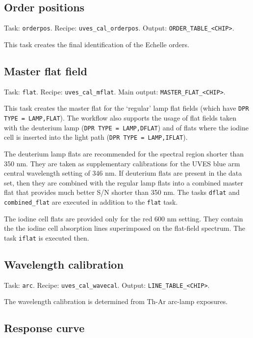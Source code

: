 \subsection{Order positions}

Task: {\tt orderpos}. Recipe: {\tt uves\_cal\_orderpos}. Output: {\tt ORDER\_TABLE\_<CHIP>}.

This task creates the final identification of the Echelle orders.

\subsection{Master flat field}

Task: {\tt flat}. Recipe: {\tt uves\_cal\_mflat}. Main output: {\tt  MASTER\_FLAT\_<CHIP>}.

This task creates the master flat for the `regular' lamp flat fields (which have {\tt DPR TYPE = 
LAMP,FLAT}). The workflow also supports the usage of flat fields taken with the deuterium lamp
({\tt DPR TYPE = LAMP,DFLAT}) and of flats where the iodine cell is inserted into the light path
({\tt DPR TYPE = LAMP,IFLAT}). 

The deuterium lamp flats are recommended for the spectral region shorter than 350 nm. 
They are taken as supplementary calibrations for
the UVES blue arm central wavelength setting of 346 nm. 
If deuterium flats are present in the data set,
then they are combined with the regular lamp flats into a combined master flat that provides much better
S/N shorter than 350 nm. The tasks {\tt dflat} and {\tt combined\_flat} are executed in addition to the
{\tt flat} task.

The iodine cell flats are provided only for the red 600 nm setting. They contain the the iodine cell
absorption lines superimposed on the flat-field spectrum. The task {\tt iflat} is executed then.

\subsection{Wavelength calibration}

Task: {\tt arc}. Recipe: {\tt uves\_cal\_wavecal}. Output: {\tt LINE\_TABLE\_<CHIP>}.

The wavelength calibration is determined from Th-Ar arc-lamp exposures.

\subsection{Response curve}

